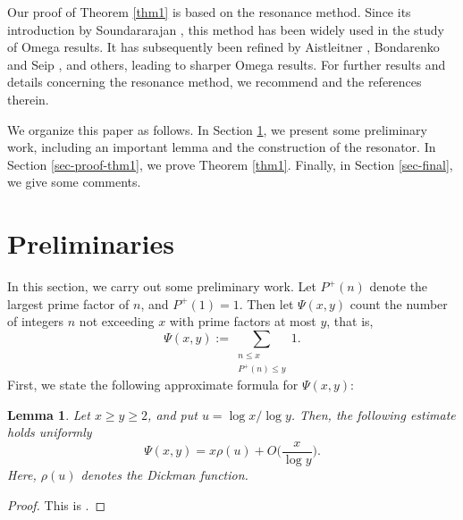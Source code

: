 \documentclass[12pt,reqno]{amsart}
\newtheorem{lem}[thm]{Lemma}
\theoremstyle{definition}
\numberwithin{equation}{section}
\newcommand{\Bg}{\Big}
\begin{document}
Our proof of Theorem \ref{thm1} is based on the resonance method. Since its introduction by Soundararajan \cite{soundararajan2008extreme}, this method has been widely used in the study of Omega results. It has subsequently been refined by Aistleitner \cite{aistleitner2016MathAnn}, Bondarenko and Seip \cite{bondarenko2018argument}, and others, leading to sharper Omega results. For further results and details concerning the resonance method, we recommend \cite{Aistleitner2019QJMath,bondarenko2023dichotomy,tenen2019galsum} and the references therein.

We organize this paper as follows. In Section \ref{sec-pre}, we present some preliminary work, including an important lemma and the construction of the resonator. In Section \ref{sec-proof-thm1}, we prove Theorem \ref{thm1}. Finally, in Section \ref{sec-final}, we give some comments.

\section{Preliminaries}
\label{sec-pre}

In this section, we carry out some preliminary work.  Let \(P^+(n)\) denote the largest prime factor of \(n\), and \(P^+(1)=1\). Then let \(\Psi(x,y)\) count the number of integers \(n\) not exceeding \(x\) with prime factors at most \(y\), that is,
\[
 \Psi(x,y) := \sum_{\substack{n \le x \\ P^+(n) \le y}} 1.
\]
First, we state the following approximate formula for \(\Psi(x,y)\):
\begin{lem}
\label{lem1}
    Let \(x \ge y \ge 2\), and put \(u =\log x/ \log y\). Then, the following estimate holds uniformly
    \[
    \Psi(x,y) = x \rho(u)+ O\Bg(\frac{x}{\log y}\Bg).
    \]
    Here, \(\rho(u)\) denotes the Dickman function.
\end{lem}

\begin{proof}
    This is \cite[Section 5.3, Theorem 6]{tenenbaumbook}.
\end{proof}
\end{document}
